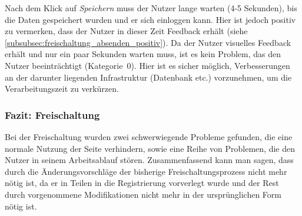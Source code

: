 {
Nach dem Klick auf \emph{Speichern} muss der Nutzer lange warten (4-5 Sekunden), bis die Daten gespeichert wurden und er sich einloggen kann. Hier ist jedoch positiv zu vermerken, dass der Nutzer in dieser Zeit Feedback erhält (siehe \ref{subsubsec:freischaltung_absenden_positiv}).
}
{
Da der Nutzer visuelles Feedback erhält und nur ein paar Sekunden warten muss, ist es kein Problem, das den Nutzer beeinträchtigt (Kategorie~0).
}
{
Hier ist es sicher möglich, Verbesserungen an der darunter liegenden Infrastruktur (Datenbank etc.) vorzunehmen, um die Verarbeitungszeit zu verkürzen.
}
\label{prob:frei:speichern}

\subsubsection*{Fazit: Freischaltung}
Bei der Freischaltung wurden zwei schwerwiegende Probleme gefunden, die eine normale Nutzung der Seite verhindern, sowie eine Reihe von Problemen, die den Nutzer in seinem Arbeitsablauf stören. Zusammenfassend kann man sagen, dass durch die Änderungsvorschläge der bisherige Freischaltungsprozess nicht mehr nötig ist, da er in Teilen in die Registrierung vorverlegt wurde und der Rest durch vorgenommene Modifikationen nicht mehr in der ursprünglichen Form nötig ist.
